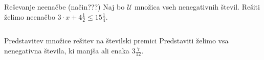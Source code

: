         \begin{frame}[t]
            
            \begin{exampleblock}{Reševanje neenačbe (način???)}
                Naj bo $\mathcal{U}$ množica vseh nenegativnih števil. Rešiti želimo neenačbo $3\cdot x+4\frac{1}{2}\leq 15\frac{1}{4}$.
                
                \begin{columns}

                \end{columns}
            \end{exampleblock}

        \end{frame}

        \begin{frame}
            \begin{block}{Predstavitev množice rešitev na številski premici}
                Predstaviti želimo vsa nenegativna števila, ki manjša ali enaka $3\frac{7}{12}$.
                
            \end{block}
        \end{frame}

        
